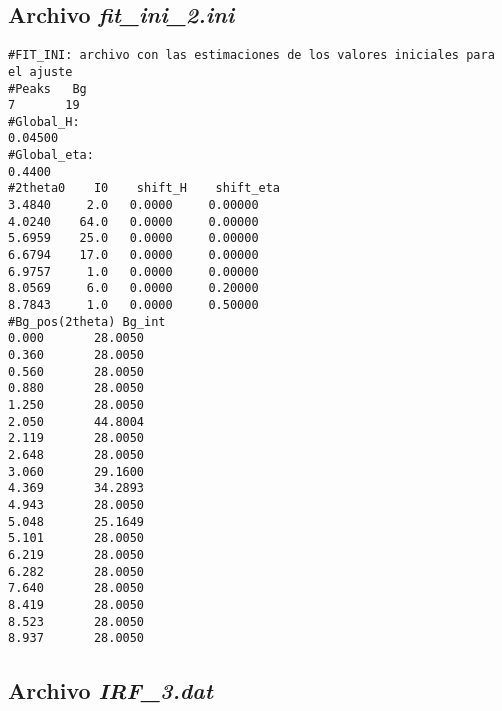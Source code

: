 \subsection*{Archivo \textit{fit_ini_2.ini}}
\begin{lstlisting}
#FIT_INI: archivo con las estimaciones de los valores iniciales para el ajuste
#Peaks   Bg
7       19
#Global_H:
0.04500   
#Global_eta:
0.4400     
#2theta0    I0    shift_H    shift_eta
3.4840     2.0   0.0000     0.00000 
4.0240    64.0   0.0000     0.00000
5.6959    25.0   0.0000     0.00000
6.6794    17.0   0.0000     0.00000
6.9757     1.0   0.0000     0.00000
8.0569     6.0   0.0000     0.20000
8.7843     1.0   0.0000     0.50000
#Bg_pos(2theta) Bg_int
0.000       28.0050
0.360       28.0050
0.560       28.0050
0.880       28.0050
1.250       28.0050
2.050       44.8004
2.119       28.0050
2.648       28.0050
3.060       29.1600
4.369       34.2893
4.943       28.0050
5.048       25.1649
5.101       28.0050
6.219       28.0050
6.282       28.0050
7.640       28.0050
8.419       28.0050
8.523       28.0050
8.937       28.0050
\end{lstlisting}

\subsection*{Archivo \textit{IRF_3.dat}}

